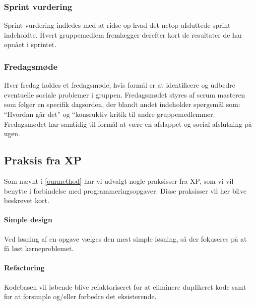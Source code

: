 {\subsubsection{Sprint vurdering}
Sprint vurdering indledes med at ridse op hvad det netop afsluttede sprint indeholdte. 
Hvert gruppemedlem fremlægger derefter kort de resultater de har opnået i sprintet.

\subsubsection{Fredagsmøde}\label{friday_meeting}
Hver fredag holdes et fredagsmøde, hvis formål er at identificere og udbedre eventuelle sociale problemer i gruppen.
Fredagsmødet styres af scrum masteren som følger en specifik dagsorden, der blandt andet indeholder spørgsmål som: ``Hvordan går det'' og ``konsruktiv kritik til andre gruppemedlemmer. 
Fredagsmødet har samtidig til formål at være en afslappet og social afslutning på ugen. 

\subsection{Praksis fra XP}\label{method:xp:practice}
Som nævnt i \cref{ourmethod} har vi udvalgt nogle praksisser fra XP, som vi vil benytte i forbindelse med programmeringsopgaver.
Disse praksisser vil her blive beskrevet kort.

\paragraph{Simple design}
Ved løsning af en opgave vælges den mest simple løsning, så der fokuseres på at få løst kerneproblemet.

\paragraph{Refactoring}
Kodebasen vil løbende blive refaktoriseret for at eliminere duplikeret kode samt for at forsimple og/eller forbedre det eksisterende.

}
